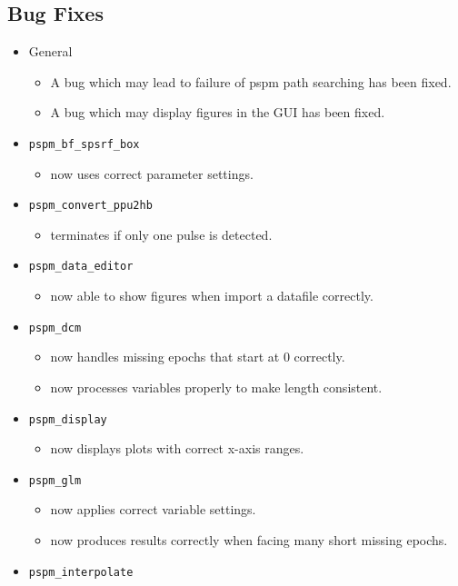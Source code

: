 \documentclass[english]{article}
\numberwithin{equation}{section}
\numberwithin{figure}{section}
\begin{document}
\subsection*{Bug Fixes}
\begin{itemize}
\item General
  \begin{itemize}
  \item A bug which may lead to failure of pspm path searching has been fixed.
  \item A bug which may display figures in the GUI has been fixed.
  \end{itemize}
\item \texttt{pspm\_bf\_spsrf\_box}
  \begin{itemize}
  \item now uses correct parameter settings.
  \end{itemize}
\item \texttt{pspm\_convert\_ppu2hb}
  \begin{itemize}
  \item terminates if only one pulse is detected.
  \end{itemize}
\item \texttt{pspm\_data\_editor}
  \begin{itemize}
  \item now able to show figures when import a datafile correctly.
  \end{itemize}
\item \texttt{pspm\_dcm}
  \begin{itemize}
  \item now handles missing epochs that start at 0 correctly.
  \item now processes variables properly to make length consistent.
  \end{itemize}
\item \texttt{pspm\_display}
  \begin{itemize}
  \item now displays plots with correct x-axis ranges.
  \end{itemize}
\item \texttt{pspm\_glm}
  \begin{itemize}
  \item now applies correct variable settings.
  \item now produces results correctly when facing many short missing epochs.
  \end{itemize}
\item \texttt{pspm\_interpolate}

\end{itemize}
\end{document}
